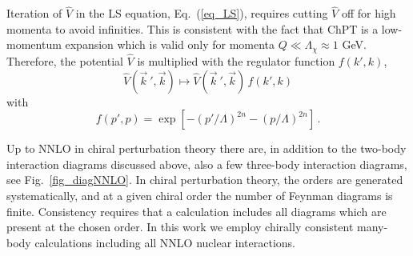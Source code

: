 Iteration of $\widehat V$ in the LS equation, Eq.~(\ref{eq_LS}),
requires cutting $\widehat V$ off for high momenta to avoid infinities.
This is consistent with the fact that ChPT
is a low-momentum expansion which
is valid only for momenta $Q \ll \Lambda_\chi \approx 1$ GeV.
Therefore, the potential $\widehat V$
is multiplied
with the regulator function $f(k',k)$,
\begin{equation}
{\widehat V}(\vec{ k}~',{\vec k})
\longmapsto
{\widehat V}(\vec{ k}~',{\vec k}) \, f(k',k) 
\end{equation}
with
\begin{equation}
f(p',p) = \exp[-(p'/\Lambda)^{2n}-(p/\Lambda)^{2n}] \,.
\label{eq:eq_f}
\end{equation}


Up to NNLO in chiral perturbation theory there are, in addition to the
two-body interaction diagrams discussed above, also a few three-body
interaction diagrams, see Fig.~\ref{fig_diagNNLO}. In
chiral perturbation theory, the orders are generated systematically,
and at a given chiral order the number of Feynman diagrams is
finite. Consistency requires that a calculation includes all diagrams
which are present at the chosen order. In this work we employ 
chirally consistent many-body calculations including all NNLO nuclear
interactions.

